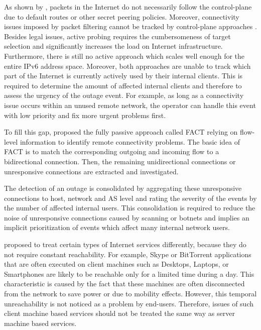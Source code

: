 As shown by \citet{Bush:Optometry}, packets in the Internet do not necessarily
follow the \gls{control-plane} due to default routes or other secret peering 
policies. Moreover, connectivity issues imposed by packet filtering cannot be 
tracked by \gls{control-plane} approaches \citep{Dainotti:2011:ACI}. 
Besides legal issues, active probing requires the cumbersomeness of target 
selection and significantly increases the load on Internet infrastructure. 
Furthermore, there is still no active approach which scales well
enough for the entire \gls{IPv6} address space. Moreover, both approaches are 
unable to track which part of the Internet is currently actively used by their 
internal clients. This is required to determine the amount of affected internal 
clients and therefore to assess the urgency of the outage event. For example, as 
long as a connectivity issue occurs within an unused remote network, the 
operator can handle this event with low priority and fix more urgent problems 
first.

To fill this gap, \citet{SchatzmannPAM2011} proposed the fully passive approach 
called \gls{FACT} relying on flow-level information to identify remote 
connectivity problems. The basic idea of \gls{FACT} is to match 
the corresponding outgoing and incoming flow to a bidirectional connection. 
Then, the remaining unidirectional connections or unresponsive connections are 
extracted and investigated. 

The detection of an outage is consolidated by aggregating these unresponsive 
connections to host, network and \gls{AS} level and rating the severity of the 
events by the number of affected internal users. This consolidation is required 
to reduce the noise of unresponsive connections caused by scanning or botnets 
and implies an implicit prioritization of events which affect many internal 
network users.

\citet{SchatzmanThesis2012} proposed to treat certain types of Internet
services differently, because they do not require constant reachability. For
example, Skype or BitTorrent applications that are often executed on client
machines such as Desktops, Laptops, or Smartphones are likely to be reachable
only for a limited time during a day.
This characteristic is caused by the fact that these machines are often
disconnected from the network to save power or due to mobility effects. However, 
this temporal unreachability is not noticed as a problem by end-users. 
Therefore, issues of such client machine based services should not be treated 
the same way as server machine based services.

